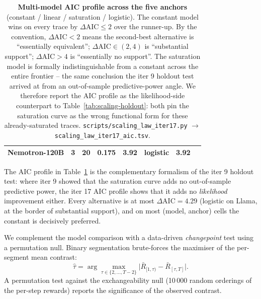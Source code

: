 \documentclass{article}
\providecommand{\tableref}[1]{Table~\ref{#1}}
\begin{document}
\begin{table}[t]
\begin{tabular}{lrrrrrrl}
    Nemotron-120B         & 3 & 20 & 0.175 & 3.92 & logistic            & 3.92 \\
    \bottomrule
  \end{tabular}
  \caption{\textbf{Multi-model AIC profile across the five
    anchors} (constant / linear / saturation / logistic).
    The constant model wins on every trace by $\Delta\text{AIC}
    \le 2$ over the runner-up.  By the \citet{burnham2002model}
    convention, $\Delta\text{AIC} < 2$ means the second-best
    alternative is ``essentially equivalent''; $\Delta\text{AIC}
    \in (2, 4)$ is ``substantial support''; $\Delta\text{AIC} > 4$
    is ``essentially no support''.  The saturation model is
    formally indistinguishable from a constant across the entire
    frontier -- the same conclusion the iter 9 holdout test
    arrived at from an out-of-sample predictive-power angle.  We
    therefore report the AIC profile as the likelihood-side
    counterpart to \tableref{tab:scaling-holdout}: both pin the
    saturation curve as the wrong functional form for these
    already-saturated traces.
    \texttt{scripts/scaling\_law\_iter17.py} $\to$
    \texttt{scaling\_law\_iter17\_aic.tsv}.}
  \label{tab:scaling-iter17-aic}
\end{table}

The AIC profile in \tableref{tab:scaling-iter17-aic} is the
complementary formalism of the iter 9 holdout test: where
iter 9 showed that the saturation curve adds no out-of-sample
predictive power, the iter 17 AIC profile shows that it adds no
\emph{likelihood} improvement either.  Every alternative is at
most $\Delta\text{AIC} = 4.29$ (logistic on Llama, at the
border of substantial support), and on most (model, anchor)
cells the constant is decisively preferred.

We complement the model comparison with a data-driven
\emph{changepoint} test using a permutation null.  Binary
segmentation brute-forces the maximiser of the per-segment
mean contrast:
\begin{equation}
  \label{eq:changepoint}
  \hat\tau
    = \arg\max_{\tau \in \{2, \dots, T-2\}}
       \bigl|\bar R_{[1,\tau)} - \bar R_{[\tau,T]}\bigr|.
\end{equation}
A permutation test against the exchangeability null (10\,000
random orderings of the per-step rewards) reports the
significance of the observed contrast.
\end{document}

